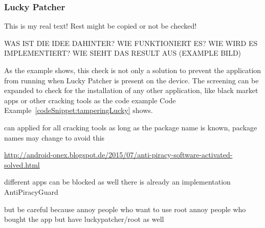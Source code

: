 \subsubsection{Lucky Patcher} \label{subsection:counter-improve-tampering-luckypatcher}
This is my real text! Rest might be copied or not be checked!



WAS IST DIE IDEE DAHINTER? WIE FUNKTIONIERT ES? WIE WIRD ES IMPLEMENTIERT? WIE SIEHT DAS RESULT AUS (EXAMPLE BILD)\newline

As the example shows, this check is not only a solution to prevent the application from running when Lucky Patcher is present on the device. The screening can be expanded to check for the installation of any other application, like black market apps or other cracking tools as the code example Code Example~\ref{codeSnippet:tamperingLucky} shows.

can applied for all cracking tools as long as the package name is known, package names may change to avoid this

\url{http://android-onex.blogspot.de/2015/07/anti-piracy-software-activated-solved.html}\newline




different apps can be blocked as well
\cite{androidCrackingTools}
there is already an implementation AntiPiracyGuard \cite{antipiracy}

but be careful because
annoy people who want to use root
annoy people who bought the app but have luckypatcher/root as well
